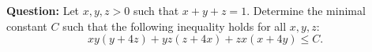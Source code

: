 \begin{examplebox}
\textbf{Question:} Let $x, y, z > 0$ such that $x+y+z=1$. Determine the minimal constant $C$ such that the following inequality holds for all $x, y, z$:
$$x y(y+4 z)+y z(z+4 x)+z x(x+4 y) \leq C.$$
\end{examplebox}